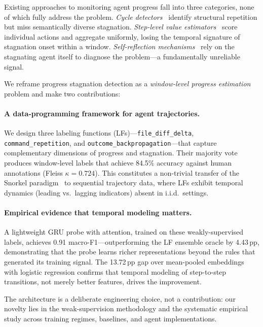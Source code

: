 \documentclass[11pt,a4paper]{article}
\begin{document}
Existing approaches to monitoring agent progress fall into three categories, none of which fully address the problem.
\emph{Cycle detectors}~\cite{chen2024codeagent,guo2024specra} identify structural repetition but miss semantically diverse stagnation.
\emph{Step-level value estimators}~\cite{luo2024agentprm,chen2024swetrace} score individual actions and aggregate uniformly, losing the temporal signature of stagnation onset within a window.
\emph{Self-reflection mechanisms}~\cite{zhang2024agentcollab} rely on the stagnating agent itself to diagnose the problem---a fundamentally unreliable signal.

We reframe progress stagnation detection as a \emph{window-level progress estimation} problem and make two contributions:

\paragraph{A data-programming framework for agent trajectories.}
We design three labeling functions (LFs)---\texttt{file\_diff\_delta}, \texttt{command\_repetition}, and \texttt{outcome\_backpropagation}---that capture complementary dimensions of progress and stagnation.
Their majority vote produces window-level labels that achieve 84.5\% accuracy against human annotations (Fleiss $\kappa=0.724$).
This constitutes a non-trivial transfer of the Snorkel paradigm~\cite{ratner2017snorkel} to sequential trajectory data, where LFs exhibit temporal dynamics (leading vs.\ lagging indicators) absent in i.i.d.\ settings.

\paragraph{Empirical evidence that temporal modeling matters.}
A lightweight GRU probe with attention, trained on these weakly-supervised labels, achieves 0.91 macro-F1---outperforming the LF ensemble oracle by 4.43\,pp, demonstrating that the probe learns richer representations beyond the rules that generated its training signal.
The 13.72\,pp gap over mean-pooled embeddings with logistic regression confirms that temporal modeling of step-to-step transitions, not merely better features, drives the improvement.

The architecture is a deliberate engineering choice, not a contribution: our novelty lies in the weak-supervision methodology and the systematic empirical study across training regimes, baselines, and agent implementations.
\end{document}
